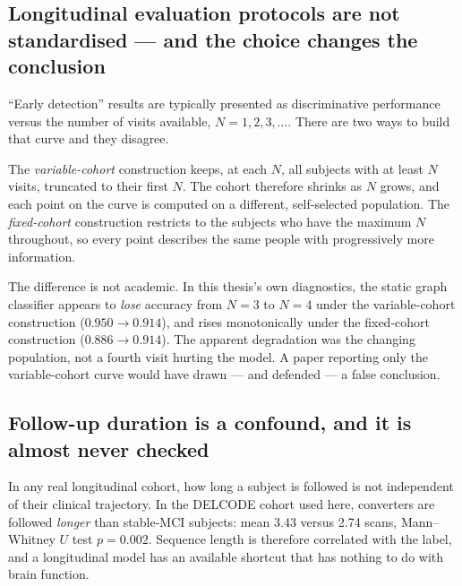 \subsection{Longitudinal evaluation protocols are not standardised --- and the choice
  changes the conclusion}
\label{sec:gap-protocol}

``Early detection'' results are typically presented as discriminative performance versus
the number of visits available, $N = 1, 2, 3, \ldots$. There are two ways to build that
curve and they disagree.

The \emph{variable-cohort} construction keeps, at each $N$, all subjects with at least $N$
visits, truncated to their first $N$. The cohort therefore shrinks as $N$ grows, and each
point on the curve is computed on a different, self-selected population. The
\emph{fixed-cohort} construction restricts to the subjects who have the maximum $N$
throughout, so every point describes the same people with progressively more information.

The difference is not academic. In this thesis's own diagnostics, the static graph
classifier appears to \emph{lose} accuracy from $N = 3$ to $N = 4$ under the
variable-cohort construction ($0.950 \rightarrow 0.914$), and rises monotonically under the
fixed-cohort construction ($0.886 \rightarrow 0.914$). The apparent degradation was the
changing population, not a fourth visit hurting the model. A paper reporting only the
variable-cohort curve would have drawn --- and defended --- a false conclusion.


\subsection{Follow-up duration is a confound, and it is almost never checked}
\label{sec:gap-attrition}

In any real longitudinal cohort, how long a subject is followed is not independent of
their clinical trajectory. In the DELCODE cohort used here, converters are followed
\emph{longer} than stable-MCI subjects: mean 3.43 versus 2.74 scans, Mann--Whitney
$U$ test $p = 0.002$. Sequence length is therefore correlated with the label, and a
longitudinal model has an available shortcut that has nothing to do with brain function.

